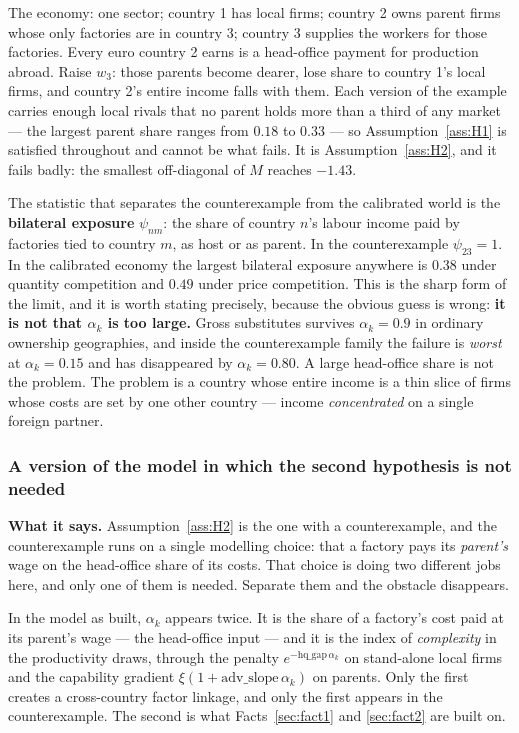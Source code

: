 \documentclass[11pt]{article}
\newcommand{\says}[1]{\smallskip\noindent\textbf{What it says.} #1\smallskip}
\theoremstyle{plain}
\theoremstyle{remark}
\theoremstyle{definition}
\begin{document}
\noindent The economy: one sector; country 1 has local firms; country 2 owns parent
firms whose only factories are in country 3; country 3 supplies the workers for those
factories. Every euro country 2 earns is a head-office payment for production abroad.
Raise $w_3$: those parents become dearer, lose share to country 1's local firms, and
country 2's entire income falls with them. Each version of the example carries enough
local rivals that no parent holds more than a third of any market --- the largest
parent share ranges from $0.18$ to $0.33$ --- so Assumption~\ref{ass:H1} is satisfied
throughout and cannot be what fails. It is Assumption~\ref{ass:H2}, and it fails badly:
the smallest off-diagonal of $M$ reaches $-1.43$.

The statistic that separates the counterexample from the calibrated world is the
\textbf{bilateral exposure} $\psi_{nm}$: the share of country $n$'s labour income paid
by factories tied to country $m$, as host or as parent. In the counterexample
$\psi_{23}=1$. In the calibrated economy the largest bilateral exposure anywhere is
$0.38$ under quantity competition and $0.49$ under price competition. This is the
sharp form of the limit, and it is worth stating precisely, because the obvious guess
is wrong: \textbf{it is not that $\alpha_k$ is too large.} Gross substitutes survives
$\alpha_k=0.9$ in ordinary ownership geographies, and inside the counterexample family the
failure is \emph{worst} at $\alpha_k=0.15$ and has disappeared by $\alpha_k=0.80$. A large
head-office share is not the problem. The problem is a country whose entire income is a
thin slice of firms whose costs are set by one other country --- income \emph{concentrated}
on a single foreign partner.

\subsubsection{A version of the model in which the second hypothesis is not needed}
\label{sec:simple}

\says{Assumption~\ref{ass:H2} is the one with a counterexample, and the counterexample
runs on a single modelling choice: that a factory pays its \emph{parent's} wage on the
head-office share of its costs. That choice is doing two different jobs here, and only
one of them is needed. Separate them and the obstacle disappears.}

In the model as built, $\alpha_k$ appears twice. It is the share of a factory's cost
paid at its parent's wage --- the head-office input --- and it is the index of
\emph{complexity} in the productivity draws, through the penalty $e^{-\text{hq\_gap}\,
\alpha_k}$ on stand-alone local firms and the capability gradient
$\xi(1+\text{adv\_slope}\,\alpha_k)$ on parents. Only the first creates a cross-country
factor linkage, and only the first appears in the counterexample. The second is what
Facts~\ref{sec:fact1} and \ref{sec:fact2} are built on.
\end{document}
